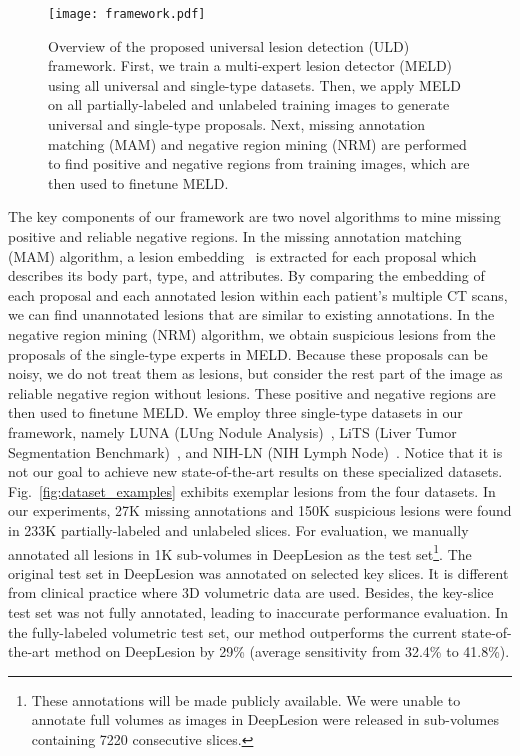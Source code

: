 \documentclass[runningheads]{llncs}
\def\Fig#1{{Fig.~\ref{fig:#1}}}
\begin{document}
\begin{figure}[]
	\centering
	\texttt{[image: framework.pdf]} \caption{Overview of the proposed universal lesion detection (ULD) framework. First, we train a multi-expert lesion detector (MELD) using all universal and single-type datasets. Then, we apply MELD on all partially-labeled and unlabeled training images to generate universal and single-type proposals. Next, missing annotation matching (MAM) and negative region mining (NRM) are performed to find positive and negative regions from training images, which are then used to finetune MELD.}
	\label{fig:framework} \vspace{-3mm}
\end{figure}

The key components of our framework are two novel algorithms to mine missing positive and reliable negative regions. In the missing annotation matching (MAM) algorithm, a lesion embedding~\cite{Yan2019Lesa} is extracted for each proposal which describes its body part, type, and attributes. By comparing the embedding of each proposal and each annotated lesion within each patient's multiple CT scans, we can find unannotated lesions that are similar to existing annotations. In the negative region mining (NRM) algorithm, we obtain suspicious lesions from the proposals of the single-type experts in MELD. Because these proposals can be noisy, we do not treat them as lesions, but consider the rest part of the image as reliable negative region without lesions. These positive and negative regions are then used to finetune MELD. We employ three single-type datasets in our framework, namely LUNA (LUng Nodule Analysis)~\cite{Setio2017LUNA}, LiTS (Liver Tumor Segmentation Benchmark)~\cite{Bilic2019LiTS}, and NIH-LN (NIH Lymph Node)~\cite{NIH_LN_dataset}. Notice that it is not our goal to achieve new state-of-the-art results on these specialized datasets. \Fig{dataset_examples} exhibits exemplar lesions from the four datasets. In our experiments, 27K missing annotations and 150K suspicious lesions were found in 233K partially-labeled and unlabeled slices. For evaluation, we manually annotated all lesions in 1K sub-volumes in DeepLesion as the test set\footnote{\scriptsize These annotations will be made publicly available. We were unable to annotate full volumes as images in DeepLesion were released in sub-volumes containing 7220 consecutive slices.}. The original test set in DeepLesion was annotated on selected key slices. It is different from clinical practice where 3D volumetric data are used. Besides, the key-slice test set was not fully annotated, leading to inaccurate performance evaluation. In the fully-labeled volumetric test set, our method outperforms the current state-of-the-art method on DeepLesion by 29\% (average sensitivity from 32.4\% to 41.8\%). 
\end{document}
